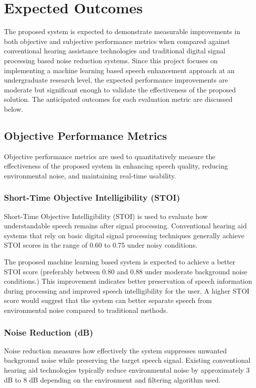 \chapter{Expected Outcomes}

The proposed system is expected to demonstrate measurable improvements in both objective and subjective performance metrics when compared against conventional hearing assistance technologies and traditional digital signal processing based noise reduction systems. Since this project focuses on implementing a machine learning based speech enhancement approach at an undergraduate research level, the expected performance improvements are moderate but significant enough to validate the effectiveness of the proposed solution. The anticipated outcomes for each evaluation metric are discussed below.

\section{Objective Performance Metrics}
Objective performance metrics are used to quantitatively measure the effectiveness of the proposed system in enhancing speech quality, reducing environmental noise, and maintaining real-time usability.

\subsection{Short-Time Objective Intelligibility (STOI)}
Short-Time Objective Intelligibility (STOI) is used to evaluate how understandable speech remains after signal processing. Conventional hearing aid systems that rely on basic digital signal processing techniques generally achieve STOI scores in the range of 0.60 to 0.75 under noisy conditions.

The proposed machine learning based system is expected to achieve a better STOI score (preferably between 0.80 and 0.88 under moderate background noise conditions.) This improvement indicates better preservation of speech information during processing and improved speech intelligibility for the user. A higher STOI score would suggest that the system can better separate speech from environmental noise compared to traditional methods.

\subsection{Noise Reduction (dB)}
Noise reduction measures how effectively the system suppresses unwanted background noise while preserving the target speech signal. Existing conventional hearing aid technologies typically reduce environmental noise by approximately 3 dB to 8 dB depending on the environment and filtering algorithm used.

